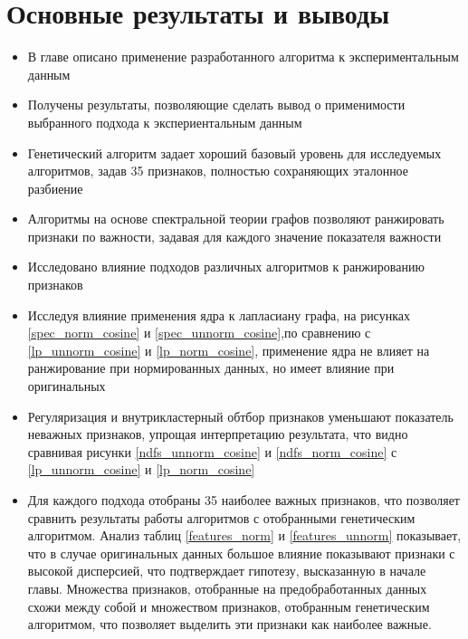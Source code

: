 \section{Основные результаты и выводы}
\begin{itemize}
	\item В главе описано применение разработанного алгоритма к экспериментальным данным
	\item Получены результаты, позволяющие сделать вывод о применимости выбранного подхода к экспериентальным данным
	\item Генетический алгоритм задает хороший базовый уровень для исследуемых алгоритмов, задав 35 признаков, полностью сохраняющих эталонное разбиение
	\item Алгоритмы на основе спектральной теории графов позволяют ранжировать признаки по важности, задавая для каждого значение показателя важности
	\item Исследовано влияние подходов различных алгоритмов к ранжированию признаков
	\item Исследуя влияние применения ядра к лапласиану графа, на рисунках \ref{spec_norm_cosine} и \ref{spec_unnorm_cosine},по сравнению с \ref{lp_unnorm_cosine} и \ref{lp_norm_cosine}, применение ядра не влияет на ранжирование при нормированных данных, но имеет влияние при оригинальных
	\item Регуляризация и внутрикластерный обтбор признаков уменьшают показатель неважных признаков, упрощая интерпретацию результата, что видно сравнивая рисунки \ref{ndfs_unnorm_cosine} и \ref{ndfs_norm_cosine} с \ref{lp_unnorm_cosine} и \ref{lp_norm_cosine}
	\item Для каждого подхода отобраны 35 наиболее важных признаков, что позволяет сравнить результаты работы алгоритмов с отобранными генетическим алгоритмом. Анализ таблиц \ref{features_norm} и \ref{features_unnorm} показывает, что в случае оригинальных данных большое влияние показывают признаки с высокой дисперсией, что подтверждает гипотезу, высказанную в начале главы. Множества признаков, отобранные на предобработанных данных схожи между собой и множеством признаков, отобранным генетическим алгоритмом, что позволяет выделить эти признаки как наиболее важные. 
\end{itemize}